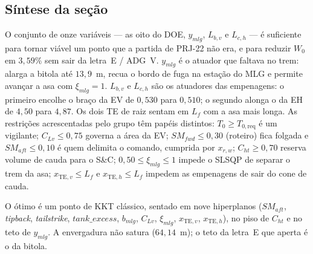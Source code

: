 \subsection{Síntese da seção}
\label{sec:p3sintese}

O conjunto de onze variáveis --- as oito do DOE, $y_{mlg}$, $L_{b,v}$ e
$L_{c,h}$ --- é suficiente para tornar viável um ponto que a partida de
PRJ-22 não era, e para reduzir $W_0$ em $3{,}59\%$ sem sair da letra~E /
ADG~V. $y_{mlg}$ é o atuador que faltava no trem: alarga a bitola até
$13{,}9$~m, recua o bordo de fuga na estação do MLG e permite avançar a
asa com $\xi_{mlg}=1$. $L_{b,v}$ e $L_{c,h}$ são os atuadores das
empenagens: o primeiro encolhe o braço da EV de $0{,}530$ para $0{,}510$;
o segundo alonga o da EH de $4{,}50$ para $4{,}87$. Os dois TE de raiz
sentam em $L_f$ com a asa mais longa. As restrições acrescentadas pelo
grupo têm papéis distintos: $T_0\ge T_{0,\mathrm{req}}$ é um vigilante;
$C_{Lv}\le 0{,}75$ governa a área da EV; $SM_{fwd}\le 0{,}30$ (roteiro)
fica folgada e $SM_{aft}\le 0{,}10$ é quem delimita o comando, cumprida
por $x_{r,w}$;
$C_{ht}\ge 0{,}70$ reserva volume de cauda para o S\&C;
$0{,}50\le\xi_{mlg}\le 1$ impede o SLSQP de separar o trem da asa;
$x_{\mathrm{TE},v}\le L_f$ e $x_{\mathrm{TE},h}\le L_f$ impedem as
empenagens de sair do cone de cauda.

O ótimo é um ponto de KKT clássico, sentado em nove hiperplanos
($SM_{aft}$, \emph{tipback}, \emph{tailstrike}, $tank\_excess$, $b_{mlg}$,
$C_{Lv}$, $\xi_{mlg}$, $x_{\mathrm{TE},v}$, $x_{\mathrm{TE},h}$), no piso
de $C_{ht}$ e no teto de $y_{mlg}$. A envergadura não satura
($64{,}14$~m); o teto da letra~E que aperta é o da bitola.
